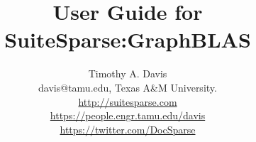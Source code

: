 \documentclass[12pt]{article}
\title{User Guide for SuiteSparse:GraphBLAS}
\author{Timothy A. Davis \\
\small
davis@tamu.edu, Texas A\&M University. \\
\small
\url{http://suitesparse.com} \\
\small
\url{https://people.engr.tamu.edu/davis} \\
\small
\url{https://twitter.com/DocSparse}
}
\begin{document}
\maketitle

\newpage
{\small
\tableofcontents
}























\end{document}
